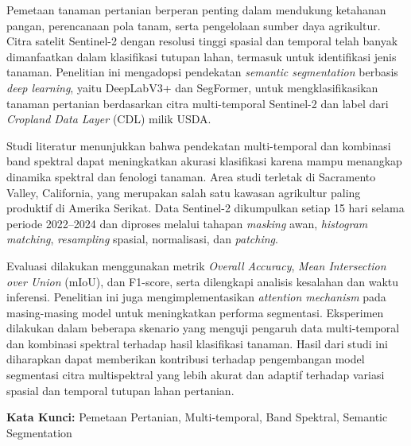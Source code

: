 Pemetaan tanaman pertanian berperan penting dalam mendukung ketahanan pangan, perencanaan pola tanam, serta pengelolaan sumber daya agrikultur. 
Citra satelit Sentinel-2 dengan resolusi tinggi spasial dan temporal telah banyak dimanfaatkan dalam klasifikasi tutupan lahan, termasuk untuk identifikasi jenis tanaman. 
Penelitian ini mengadopsi pendekatan \textit{semantic segmentation} berbasis \textit{deep learning}, yaitu DeepLabV3+ dan SegFormer, untuk mengklasifikasikan tanaman pertanian berdasarkan citra multi-temporal Sentinel-2 dan label dari \textit{Cropland Data Layer} (CDL) milik USDA. 

Studi literatur menunjukkan bahwa pendekatan multi-temporal dan kombinasi band spektral dapat meningkatkan akurasi klasifikasi karena mampu menangkap dinamika spektral dan fenologi tanaman. 
Area studi terletak di Sacramento Valley, California, yang merupakan salah satu kawasan agrikultur paling produktif di Amerika Serikat. 
Data Sentinel-2 dikumpulkan setiap 15 hari selama periode 2022--2024 dan diproses melalui tahapan \textit{masking} awan, \textit{histogram matching}, \textit{resampling} spasial, normalisasi, dan \textit{patching}. 

Evaluasi dilakukan menggunakan metrik \textit{Overall Accuracy}, \textit{Mean Intersection over Union} (mIoU), dan F1-score, serta dilengkapi analisis kesalahan dan waktu inferensi. 
Penelitian ini juga mengimplementasikan \textit{attention mechanism} pada masing-masing model untuk meningkatkan performa segmentasi. 
Eksperimen dilakukan dalam beberapa skenario yang menguji pengaruh data multi-temporal dan kombinasi spektral terhadap hasil klasifikasi tanaman. 
Hasil dari studi ini diharapkan dapat memberikan kontribusi terhadap pengembangan model segmentasi citra multispektral yang lebih akurat dan adaptif terhadap variasi spasial dan temporal tutupan lahan pertanian.

\vspace{0.5cm}
\textbf{Kata Kunci:} Pemetaan Pertanian, Multi-temporal, Band Spektral, Semantic Segmentation
